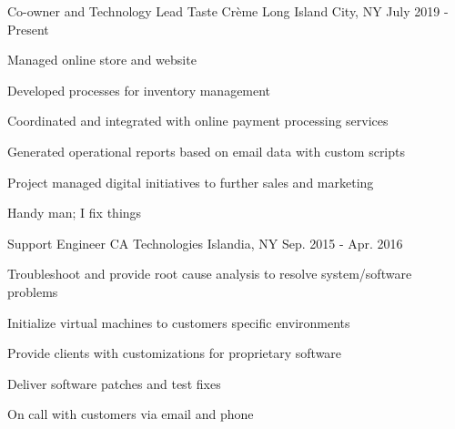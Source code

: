 \begin{cventries}

\cventry
{Co-owner and Technology Lead} %
{Taste Crème} %
{Long Island City, NY} %
{July 2019 - Present} %
{ %
\begin{cvitems}
\item {Managed online store and website}
\item {Developed processes for inventory management}
\item {Coordinated and integrated with online payment processing services}
\item {Generated operational reports based on email data with custom scripts}
\item {Project managed digital initiatives to further sales and marketing}
\item {Handy man; I fix things}
\end{cvitems}
\bigskip
}


\cventry
{Support Engineer} %
{CA Technologies} %
{Islandia, NY} %
{Sep. 2015 - Apr. 2016} %
{ %
\begin{cvitems}
\item {Troubleshoot and provide root cause analysis to resolve system/software problems}
\item {Initialize virtual machines to customers specific environments}
\item {Provide clients with customizations for proprietary software}
\item {Deliver software patches and test fixes}
\item {On call with customers via email and phone}
\end{cvitems} 
}


\end{cventries}
